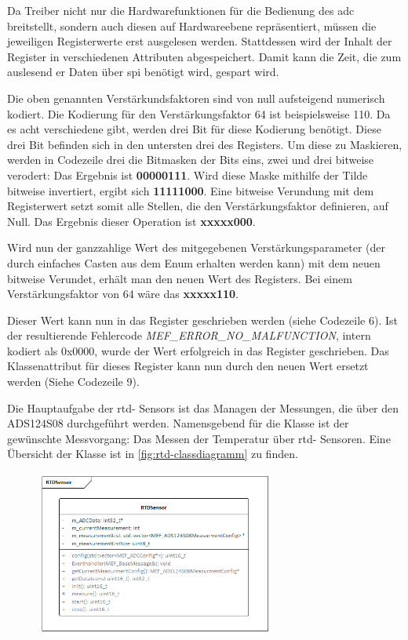 Da Treiber nicht nur die Hardwarefunktionen für die Bedienung des \ac{adc} breitstellt, sondern auch diesen auf Hardwareebene repräsentiert, müssen die jeweiligen Registerwerte erst ausgelesen werden.
Stattdessen wird der Inhalt der Register in verschiedenen Attributen abgespeichert.
Damit kann die Zeit, die zum auslesend er Daten über \ac{spi} benötigt wird, gespart wird.

Die oben genannten Verstärkundsfaktoren sind von null aufsteigend numerisch kodiert.
Die Kodierung für den Verstärkungsfaktor 64 ist beispielsweise 110.
Da es acht verschiedene gibt, werden drei Bit für diese Kodierung benötigt.
Diese drei Bit befinden sich in den untersten drei des Registers.
Um diese zu Maskieren, werden in Codezeile drei die Bitmasken der Bits eins, zwei und drei bitweise verodert: Das Ergebnis ist \textbf{00000111}.
Wird diese Maske mithilfe der Tilde bitweise invertiert, ergibt sich \textbf{11111000}.
Eine bitweise Verundung mit dem Registerwert setzt somit alle Stellen, die den Verstärkungsfaktor definieren, auf Null.
Das Ergebnis dieser Operation ist \textbf{xxxxx000}.

Wird nun der ganzzahlige Wert des mitgegebenen Verstärkungsparameter (der durch einfaches Casten aus dem Enum erhalten werden kann) mit dem neuen bitweise Verundet, erhält man den neuen Wert des Registers.
Bei einem Verstärkungsfaktor von 64 wäre das \textbf{xxxxx110}.

Dieser Wert kann nun in das Register geschrieben werden (siehe Codezeile 6).
Ist der resultierende Fehlercode \textit{MEF\_ERROR\_NO\_MALFUNCTION}, intern kodiert als 0x0000, wurde der Wert erfolgreich in das Register geschrieben.
Das Klassenattribut für dieses Register kann nun durch den neuen Wert ersetzt werden (Siehe Codezeile 9).

Die Hauptaufgabe der \ac{rtd}- Sensors ist das Managen der Messungen, die über den ADS124S08 durchgeführt werden.
Namensgebend für die Klasse ist der gewünschte Messvorgang: Das Messen der Temperatur über \ac{rtd}- Sensoren.
Eine Übersicht der Klasse ist in \autoref{fig:rtd-classdiagramm} zu finden.

\begin{figure}[!htb]
    \begin{center}
        \includegraphics[width=0.7\textwidth]{Figures/Chapter_3/RTDSensor.png}
        
        \label{fig:rtd-classdiagramm}
    \end {center}
\end{figure}

